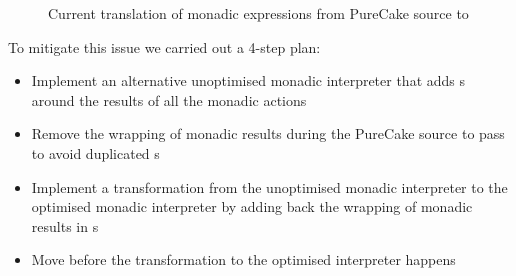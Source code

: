\begin{figure}[h]
  \caption{Current translation of monadic expressions from PureCake source to
           \ThunkLang{}}
\end{figure}

To mitigate this issue we carried out a 4-step plan:
\begin{itemize}
  \item Implement an alternative unoptimised monadic interpreter that adds
    s around the results of all the monadic actions
  \item Remove the wrapping of monadic results during the PureCake source to
    \ThunkLang{} pass to avoid duplicated s
  \item Implement a transformation from the unoptimised monadic interpreter to
    the optimised monadic interpreter by adding back the wrapping of monadic
    results in s
  \item Move  before the transformation to the optimised
    interpreter happens
\end{itemize}

